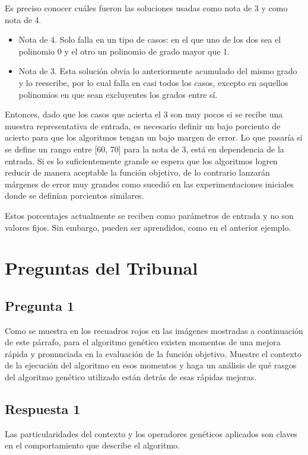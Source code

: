 \documentclass[a4paper,11pt]{article}
\begin{document}
		Es preciso conocer cuáles fueron las soluciones usadas como nota de 3 y como nota de 4.
		
		\begin{itemize}
			\item Nota de 4. Solo falla en un tipo de casos: en el que uno de los dos sea el polinomio 0 y el otro un polinomio de grado mayor que 1.
			
			\item Nota de 3. Esta solución obvia lo anteriormente acumulado del mismo grado y lo reescribe, por lo cual falla en casi todos los casos, excepto en aquellos polinomios en que sean excluyentes los grados entre sí.
		\end{itemize}
		
		Entonces, dado que los casos que acierta el 3 son muy pocos si se recibe una muestra representativa de entrada, es necesario definir un bajo porciento de acierto para que los algoritmos tengan un bajo margen de error. Lo que pasaría si se define un rango entre [60, 70] para la nota de 3, está en dependencia de la entrada. Si es lo suficientemente grande se espera que los algoritmos logren reducir de manera aceptable la función objetivo, de lo contrario lanzarán márgenes de error muy grandes como sucedió en las experimentaciones iniciales donde se definían porcientos similares.
		
		Estos porcentajes actualmente se reciben como parámetros de entrada y no son valores fijos. Sin embargo, pueden ser aprendidos, como en el anterior ejemplo.
		
		\section*{Preguntas del Tribunal}
		
			\subsection*{Pregunta 1}
			Como se muestra en los recuadros rojos en las imágenes mostradas a continuación de este párrafo, para el algoritmo genético existen momentos de una mejora rápida y pronunciada en la evaluación de la función objetivo. Muestre el contexto de la ejecución del algoritmo en esos momentos y haga un análisis de qué rasgos del algoritmo genético utilizado están detrás de esas rápidas mejoras. 
			
			\subsection*{Respuesta 1}
			Las particularidades del contexto y los operadores genéticos aplicados son claves en el comportamiento que describe el algoritmo.
			
\end{document}
